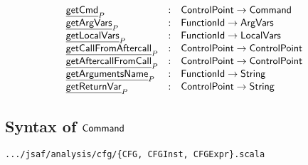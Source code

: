 \documentclass{article}
\newcommand{\SF}[1]{\mbox{\textsf{#1}}}
\newcommand{\Command}{\SF{Command}}
\newcommand{\fid}{\SF{FunctionId}}
\newcommand{\args}{\SF{ArgVars}}
\newcommand{\vars}{\SF{LocalVars}}
\newcommand{\hf}[1]{\underline{\sf #1}}
\def\inblue{\color{blue}}
\begin{document}
\[
\begin{array}{lcl}
  \hf{getCmd}_{P} & : & \SF{ControlPoint} \rightarrow \Command \\
  \hf{getArgVars}_{P} & : & \fid \rightarrow \args \\
  \hf{getLocalVars}_{P} & : & \fid \rightarrow \vars \\
  \hf{getCallFromAftercall}_{P} & : & \SF{ControlPoint} \rightarrow
  \SF{ControlPoint} \\
  \hf{getAftercallFromCall}_{P} & : & \SF{ControlPoint} \rightarrow
  \SF{ControlPoint} \\
  \hf{getArgumentsName}_{P} & : & \fid \rightarrow \SF{String} \\
  \hf{getReturnVar}_{P} & : & \SF{ControlPoint} \rightarrow \SF{String} \\
\end{array}
\]
\subsection{Syntax of $\Command$}
{\inblue\tt .../jsaf/analysis/cfg/\{CFG, CFGInst, CFGExpr\}.scala}\\
\end{document}
